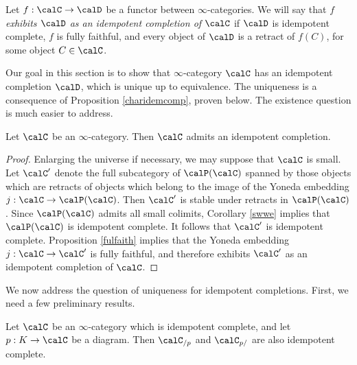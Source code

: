 \begin{definition}
Let $f: \calC \rightarrow \calD$ be a functor between $\infty$-categories. We will say that $f$ {\it exhibits $\calD$ as an idempotent completion of $\calC$} if $\calD$ is idempotent complete, $f$ is fully faithful, and every object of $\calD$ is a retract of $f(C)$, for some object $C \in \calC$.
\end{definition}

Our goal in this section is to show that $\infty$-category $\calC$ has an idempotent completion $\calD$, which is unique up to equivalence. The uniqueness is a consequence of Proposition \ref{charidemcomp}, proven below. The existence question is much easier to address.


\begin{proposition}\label{idmcoo}
Let $\calC$ be an $\infty$-category. Then $\calC$ admits an idempotent completion.
\end{proposition}

\begin{proof}
Enlarging the universe if necessary, we may suppose that $\calC$ is small. Let
$\calC'$ denote the full subcategory of $\calP(\calC)$ spanned by those objects which are retracts of objects which belong to the image of the Yoneda embedding $j: \calC \rightarrow \calP(\calC)$.
Then $\calC'$ is stable under retracts in $\calP(\calC)$. Since $\calP(\calC)$ admits all small colimits, Corollary \ref{swwe} implies that
$\calP(\calC)$ is idempotent complete. It follows that $\calC'$ is idempotent complete. Proposition \ref{fulfaith} implies that the Yoneda embedding $j: \calC \rightarrow \calC'$ is fully faithful, and therefore exhibits $\calC'$ as an idempotent completion of $\calC$.
\end{proof}

We now address the question of uniqueness for idempotent completions. First, we need a few preliminary results.

\begin{lemma}\label{sweeble}
Let $\calC$ be an $\infty$-category which is idempotent complete, and let $p: K \rightarrow \calC$ be a diagram. Then $\calC_{/p}$ and $\calC_{p/}$ are also idempotent complete.
\end{lemma}

